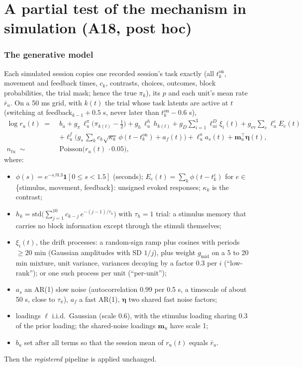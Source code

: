 \documentclass[11pt]{article}
\begin{document}
\part{A partial test of the mechanism in simulation (A18, post hoc)}

\section{The generative model}

Each simulated session copies one recorded session's task exactly (all $t^{\mathrm{on}}_k$, movement and feedback
times, $c_k$, contrasts, choices, outcomes, block probabilities, the trial mask; hence the true $\pi_k$), its $p$ and
each unit's mean rate $\bar r_u$. On a 50 ms grid, with $k(t)$ the trial whose task latents are active at $t$
(switching at feedback$_{k-1} + 0.5$ s, never later than $t^{\mathrm{on}}_k - 0.6$ s),
\begin{align}
\log r_u(t) \;=\;& b_u
 + g_\pi\, \ell^{\pi}_u \big(\pi_{k(t)} - \tfrac12\big)
 + g_h\, \ell^{h}_u\, h_{k(t)}
 + g_D \textstyle\sum_{i=1}^{3} \ell^{D}_{ui} \xi_i(t)
 + g_{\mathrm{ev}} \textstyle\sum_{e} \ell^{e}_u E_e(t) \nonumber\\
& + \ell^{f}_u \big(g_s\, \textstyle\sum_k c_k \sqrt{\kappa_k}\, \phi(t - t^{\mathrm{on}}_k) + a_f(t)\big)
 + \ell^{a}_u a_{s}(t) + \bm m_u^\top \bm\eta(t),
\label{eq:gen}\\
n_{tu} \;\sim\;& \mathrm{Poisson}\big(r_u(t)\, \cdot 0.05\big), \nonumber
\end{align}
where:
\begin{itemize}
\item $\phi(s) = e^{-s/0.3}\mathbf 1[0 \le s < 1.5]$ (seconds); $E_e(t) = \sum_k \phi(t - t^e_k)$ for $e \in$
  \{stimulus, movement, feedback\}: unsigned evoked responses; $\kappa_k$ is the contrast;
\item $h_k = \mathrm{std}\big(\sum_{j=1}^{10} c_{k-j}\, e^{-(j-1)/\tau_h}\big)$ with $\tau_h = 1$ trial: a stimulus
  memory that carries no block information except through the stimuli themselves;
\item $\xi_i(t)$, the drift processes: a random-sign ramp plus cosines with periods $\ge 20$ min (Gaussian amplitudes
  with SD $1/j$), plus weight $g_{\mathrm{mid}}$ on a 5 to 20 min mixture, unit variance, variances decaying by a
  factor 0.3 per $i$ (``low-rank''); or one such process per unit (``per-unit'');
\item $a_s$ an AR(1) slow noise (autocorrelation 0.99 per 0.5 s, a timescale of about 50 s, close to $\tau_\pi$),
  $a_f$ a fast AR(1), $\bm\eta$ two shared fast noise factors;
\item loadings $\ell$ i.i.d.\ Gaussian (scale 0.6), with the stimulus loading sharing 0.3 of the prior loading; the
  shared-noise loadings $\bm m_u$ have scale 1;
\item $b_u$ set after all terms so that the session mean of $r_u(t)$ equals $\bar r_u$.
\end{itemize}
Then the \emph{registered} pipeline is applied unchanged.
\end{document}
